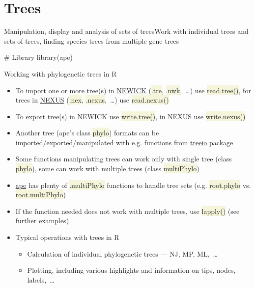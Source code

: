 \documentclass[compress, xelatex, 11pt, xcolor=svgnames, aspectratio=169,
	hyperref={
		bookmarks=true,
		unicode=true,
		colorlinks=true,
		pdftitle={Molecular data in R},
		plainpages=false,
		pdfauthor={Vojtech Zeisek},
		pdfsubject={Course about phylogeny and evolution in R},
		pdfcreator={XeLaTeX},
		pdfkeywords={R, evolution, phylogeny, molecular data},
		linkcolor=Crimson, %
		anchorcolor=Magenta, %
		citecolor=Magenta, %
		filecolor=Magenta, %
		menucolor=Magenta, %
		urlcolor=DodgerBlue, %
		},
	url={hyphens, lowtilde} %
	]{beamer}
\renewcommand{\texttt}[1]{\colorbox{Beige}{{\ttfamily #1}}}
\begin{document}
\section{Trees}

\begin{frame}[fragile]{Manipulation, display and analysis of sets of trees}{Work with individual trees and sets of trees, finding species trees from multiple gene trees}
	\tableofcontents[currentsection, sectionstyle=show/hide, hideothersubsections]
	\begin{spluscode}
    # Library
    library(ape)
	\end{spluscode}
\end{frame}

\begin{frame}[allowframebreaks]{Working with phylogenetic trees in R}
	\begin{itemize}
		\item To import one or more tree(s) in \href{https://en.wikipedia.org/wiki/Newick_format}{NEWICK} (\texttt{*.tre}, \texttt{*.nwk},~\ldots) use \texttt{read.tree()}, for trees in \href{https://en.wikipedia.org/wiki/Nexus_file}{NEXUS} (\texttt{*.nex}, \texttt{*.nexus},~\ldots) use \texttt{read.nexus()}
		\item To export tree(s) in NEWICK use \texttt{write.tree()}, in NEXUS use \texttt{write.nexus()}
		\item Another tree (ape's class \texttt{phylo}) formats can be imported/exported/manipulated with e.g. functions from \href{https://bioconductor.org/packages/release/bioc/html/treeio.html}{treeio} package
		\item Some functions manipulating trees can work only with single tree (class \texttt{phylo}), some can work with multiple trees (class \texttt{multiPhylo})
		\item \href{https://CRAN.R-project.org/package=ape}{ape} has plenty of \texttt{*.multiPhylo} functions to handle tree sets (e.g. \texttt{root.phylo} vs. \texttt{root.multiPhylo})
		\item If the function needed does not work with multiple trees, use \texttt{lapply()} (see further examples)
		\item Typical operations with trees in R
		\begin{itemize}
			\item Calculation of individual phylogenetic trees --- NJ, MP, ML,~\ldots
			\item Plotting, including various highlights and information on tips, nodes, labels,~\ldots

\end{itemize}
\end{itemize}
\end{frame}
\end{document}
